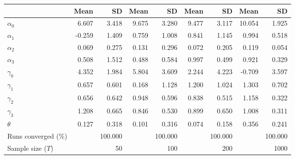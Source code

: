 
\begin{tabular}[t]{lrrrrrrrr}
\toprule
  & Mean & SD & Mean  & SD  & Mean   & SD   & Mean    & SD   \\
\midrule
$\alpha_{0}$ & 6.607 & 3.418 & 9.675 & 3.280 & 9.477 & 3.117 & 10.054 & 1.925\\
$\alpha_{1}$ & -0.259 & 1.409 & 0.759 & 1.008 & 0.841 & 1.145 & 0.994 & 0.518\\
$\alpha_{2}$ & 0.069 & 0.275 & 0.131 & 0.296 & 0.072 & 0.205 & 0.119 & 0.054\\
$\alpha_{3}$ & 0.508 & 1.512 & 0.488 & 0.584 & 0.997 & 0.499 & 0.921 & 0.329\\
$\gamma_{0}$ & 4.352 & 1.984 & 5.804 & 3.609 & 2.244 & 4.223 & -0.709 & 3.597\\
$\gamma_{1}$ & 0.657 & 0.601 & 0.168 & 1.128 & 1.200 & 1.024 & 1.303 & 0.702\\
$\gamma_{2}$ & 0.656 & 0.642 & 0.948 & 0.596 & 0.838 & 0.515 & 1.158 & 0.322\\
$\gamma_{3}$ & 1.208 & 0.665 & 0.846 & 0.530 & 0.899 & 0.650 & 1.008 & 0.311\\
$\theta$ & 0.127 & 0.318 & 0.101 & 0.316 & 0.074 & 0.158 & 0.356 & 0.241\\
Runs converged (\%) &  & 100.000 &  & 100.000 &  & 100.000 &  & 100.000\\
Sample size ($T$) &  & 50 &  & 100 &  & 200 &  & 1000\\
\bottomrule
\end{tabular}

